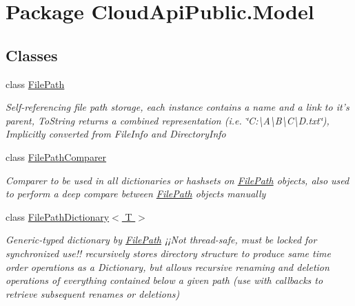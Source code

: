 \hypertarget{namespace_cloud_api_public_1_1_model}{\section{Package Cloud\-Api\-Public.\-Model}
\label{namespace_cloud_api_public_1_1_model}
}
\subsection*{Classes}
\begin{DoxyCompactItemize}
\item 
class \hyperlink{class_cloud_api_public_1_1_model_1_1_file_path}{File\-Path}
\begin{DoxyCompactList}\small\item\em Self-\/referencing file path storage, each instance contains a name and a link to it's parent, To\-String returns a combined representation (i.\-e. \char`\"{}\-C\-:\textbackslash{}\-A\textbackslash{}\-B\textbackslash{}\-C\textbackslash{}\-D.\-txt\char`\"{}), Implicitly converted from File\-Info and Directory\-Info \end{DoxyCompactList}\item 
class \hyperlink{class_cloud_api_public_1_1_model_1_1_file_path_comparer}{File\-Path\-Comparer}
\begin{DoxyCompactList}\small\item\em Comparer to be used in all dictionaries or hashsets on \hyperlink{class_cloud_api_public_1_1_model_1_1_file_path}{File\-Path} objects, also used to perform a deep compare between \hyperlink{class_cloud_api_public_1_1_model_1_1_file_path}{File\-Path} objects manually \end{DoxyCompactList}\item 
class \hyperlink{class_cloud_api_public_1_1_model_1_1_file_path_dictionary_3_01_t_01_4}{File\-Path\-Dictionary$<$ T $>$}
\begin{DoxyCompactList}\small\item\em Generic-\/typed dictionary by \hyperlink{class_cloud_api_public_1_1_model_1_1_file_path}{File\-Path} ¡¡\-Not thread-\/safe, must be locked for synchronized use!! recursively stores directory structure to produce same time order operations as a Dictionary, but allows recursive renaming and deletion operations of everything contained below a given path (use with callbacks to retrieve subsequent renames or deletions) \end{DoxyCompactList}\item 

\end{DoxyCompactItemize}
